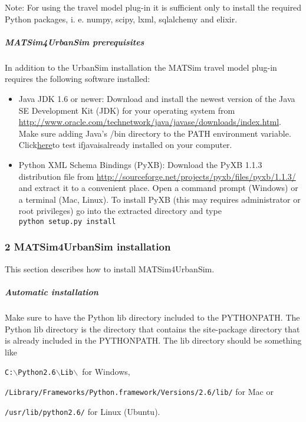 Note:  For using the travel model plug-in it is sufficient only to install the  required Python packages, i. e. numpy, scipy, lxml, sqlalchemy and  elixir.

\subparagraph{MATSim4UrbanSim prerequisites}

In addition to the UrbanSim installation the MATSim travel model plug-in requires the following software installed:
\begin{itemize}
	\item Java JDK 1.6 or newer: Download and install the newest version  of the Java SE Development Kit (JDK) for your operating system from \href{http://www.oracle.com/technetwork/java/javase/downloads/index.html}{http://www.oracle.com/technetwork/java/javase/downloads/index.html}. Make sure adding Java's /bin directory to the PATH environment variable. Click\href{http://java.com/en/download/testjava.jsp}{here}to test ifjavaisalready installed on your computer.
	\item Python XML Schema Bindings (PyXB): Download the PyXB 1.1.3 distribution file from \href{http://sourceforge.net/projects/pyxb/files/pyxb/1.1.3/}{http://sourceforge.net/projects/pyxb/files/pyxb/1.1.3/}  and extract it to a convenient place. Open a command prompt (Windows)  or a terminal (Mac, Linux). To install PyXB (this may requires  administrator or root privileges) go into the extracted directory and  type
\\


\texttt{python setup.py install}
\end{itemize}

\subsubsection{2 MATSim4UrbanSim installation}

This section describes how to install MATSim4UrbanSim.

\subparagraph{Automatic installation}

Make sure to have the Python lib directory included to the  PYTHONPATH. The Python lib directory is the directory that contains the  site-package directory that is already included in the PYTHONPATH. The  lib directory should be something like


\texttt{C:$\backslash$Python2.6$\backslash$Lib$\backslash$ }for Windows,


\texttt{/Library/Frameworks/Python.framework/Versions/2.6/lib/} for Mac or


\texttt{/usr/lib/python2.6/} for Linux (Ubuntu).

